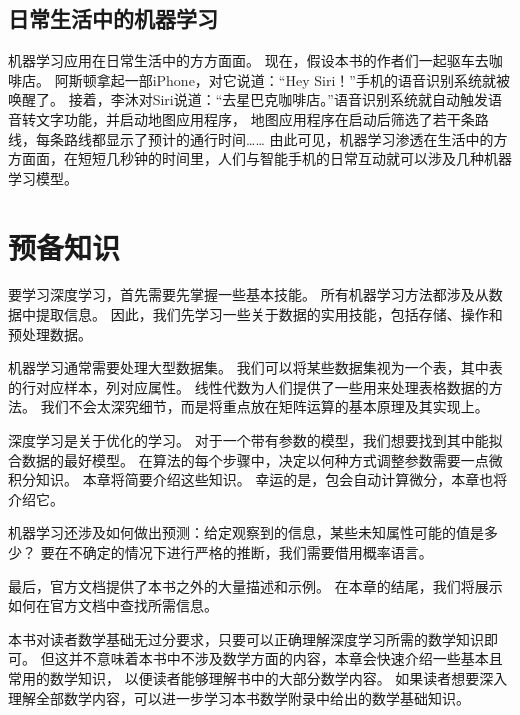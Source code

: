 \documentclass[letterpaper,10pt,english]{sphinxmanual}
\begin{document}
\section{日常生活中的机器学习}
\label{\detokenize{chapter_introduction/index:id2}}
\sphinxAtStartPar
机器学习应用在日常生活中的方方面面。
现在，假设本书的作者们一起驱车去咖啡店。
阿斯顿拿起一部iPhone，对它说道：“Hey
Siri！”手机的语音识别系统就被唤醒了。
接着，李沐对Siri说道：“去星巴克咖啡店。”语音识别系统就自动触发语音转文字功能，并启动地图应用程序，
地图应用程序在启动后筛选了若干条路线，每条路线都显示了预计的通行时间……
由此可见，机器学习渗透在生活中的方方面面，在短短几秒钟的时间里，人们与智能手机的日常互动就可以涉及几种机器学习模型。

\sphinxstepscope


\chapter{预备知识}
\label{\detokenize{chapter_preliminaries/index:chap-preliminaries}}\label{\detokenize{chapter_preliminaries/index:id1}}\label{\detokenize{chapter_preliminaries/index::doc}}
\sphinxAtStartPar
要学习深度学习，首先需要先掌握一些基本技能。
所有机器学习方法都涉及从数据中提取信息。
因此，我们先学习一些关于数据的实用技能，包括存储、操作和预处理数据。

\sphinxAtStartPar
机器学习通常需要处理大型数据集。
我们可以将某些数据集视为一个表，其中表的行对应样本，列对应属性。
线性代数为人们提供了一些用来处理表格数据的方法。
我们不会太深究细节，而是将重点放在矩阵运算的基本原理及其实现上。

\sphinxAtStartPar
深度学习是关于优化的学习。
对于一个带有参数的模型，我们想要找到其中能拟合数据的最好模型。
在算法的每个步骤中，决定以何种方式调整参数需要一点微积分知识。
本章将简要介绍这些知识。
幸运的是，包会自动计算微分，本章也将介绍它。

\sphinxAtStartPar
机器学习还涉及如何做出预测：给定观察到的信息，某些未知属性可能的值是多少？
要在不确定的情况下进行严格的推断，我们需要借用概率语言。

\sphinxAtStartPar
最后，官方文档提供了本书之外的大量描述和示例。
在本章的结尾，我们将展示如何在官方文档中查找所需信息。

\sphinxAtStartPar
本书对读者数学基础无过分要求，只要可以正确理解深度学习所需的数学知识即可。
但这并不意味着本书中不涉及数学方面的内容，本章会快速介绍一些基本且常用的数学知识，
以便读者能够理解书中的大部分数学内容。
如果读者想要深入理解全部数学内容，可以进一步学习本书数学附录中给出的数学基础知识。
\end{document}
